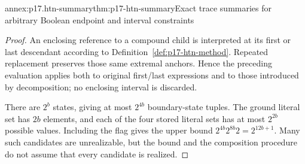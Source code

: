 \begin{annexitem}{annex:p17.htn-summary}{thm:p17-htn-summary}{Exact trace summaries for arbitrary Boolean endpoint and interval constraints}
\begin{proof}
An enclosing reference to a compound child is interpreted at its first or
last descendant according to Definition~\ref{def:p17-htn-method}. Repeated
replacement preserves those same extremal anchors. Hence the preceding
evaluation applies both to original first/last expressions and to those
introduced by decomposition; no enclosing interval is discarded.

There are \(2^b\) states, giving at most \(2^{4b}\) boundary-state tuples.
The ground literal set has \(2b\) elements, and each of the four stored
literal sets has at most \(2^{2b}\) possible values. Including the flag
gives the upper bound \(2^{4b}2^{8b}2=2^{12b+1}\). Many such candidates
are unrealizable, but the bound and the composition procedure do not assume
that every candidate is realized.
\end{proof}
\end{annexitem}

